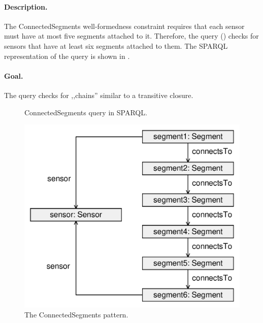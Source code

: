 \paragraph{Description.} The \textsf{ConnectedSegments} well-formedness constraint requires that each sensor must have at most five segments attached to it. Therefore, the query () checks for sensors that have at least six segments attached to them. The SPARQL representation of the query is shown in .

\paragraph{Goal.} The query checks for ,,chains'' similar to a transitive closure.

\begin{figure}[htb]
\centering
\begin{minipage}{0.9\textwidth}
  { \alignListing
    }
  \caption{\textsf{ConnectedSegments} query in SPARQL.}
  \label{lst:connectedsegments-sparql}
\end{minipage}
\end{figure}

\begin{figure}[htb]
		\centering
		\includegraphics[scale=0.4]{figures/pattern-connectedsegments}
		\caption{The \textsf{ConnectedSegments} pattern.}
		\label{fig:pattern-connectedsegments}
\end{figure}

